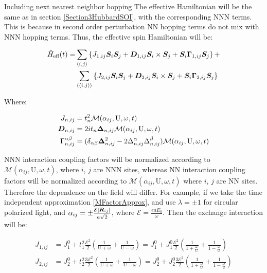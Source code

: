 \begin{section}{Including next nearest neighbor hopping}
The effective Hamiltonian will be the same as in section \ref{Section3HubbardSOI}, with the corresponding NNN terms. This is because in second order perturbation NN hopping terms do not mix with NNN hopping terms. Thus, the effective spin Hamiltonian will be:

\begin{align}
\hat{H}_{\text{eff}}(t) = &\sum_{\langle i,j \rangle} \left\{ J_{1,ij}\boldsymbol{S}_i\boldsymbol{S}_j + \boldsymbol{D}_{1,ij} \boldsymbol{S}_i \times \boldsymbol{S}_j + \boldsymbol{S}_i\boldsymbol{\Gamma}_{1,ij}\boldsymbol{S}_j\right\} + \nonumber \\
&\sum_{\langle \langle i,j \rangle \rangle} \left\{ J_{2,ij}\boldsymbol{S}_i\boldsymbol{S}_j + \boldsymbol{D}_{2,ij} \boldsymbol{S}_i \times \boldsymbol{S}_j + \boldsymbol{S}_i\boldsymbol{\Gamma}_{2,ij}\boldsymbol{S}_j\right\}
\end{align}

Where:

\begin{align}
J_{n,ij} &= t_n^2\mathcal{M}(\alpha_{ij}, \text{U}, \omega, t) \label{JGeneral} \\
\boldsymbol{D}_{n,ij} &= 2it_n \boldsymbol{\Delta}_{n,ij}\mathcal{M}(\alpha_{ij}, \text{U}, \omega, t) \label{DGeneral} \\
\Gamma_{n,ij}^{\alpha \beta} &= (\delta_{\alpha \beta} \boldsymbol{\Delta}_{n,ij}^2 - 2\Delta_{n,ij}^\alpha\Delta_{n,ij}^\beta )\mathcal{M}(\alpha_{ij}, \text{U}, \omega, t) \label{GammaGeneral}
\end{align}

NNN interaction coupling factors will be normalized according to $\mathcal{M}(\alpha_{ij}, \text{U}, \omega, t)$, where $i$, $j$ are NNN sites, whereas NN interaction coupling factors will be normalized according to $\mathcal{M}(\alpha_{ij}, \text{U}, \omega, t)$ where $i$, $j$ are NN sites. Therefore the dependence on the field will differ. For example, if we take the time independent approximation \ref{MFactorApprox}, and use $\lambda = \pm 1$ for circular polarized light, and $\alpha_{ij} = \pm\frac{\mathcal{E}|\boldsymbol{R}_{ij}|}{a\sqrt{2}}$, where $\mathcal{E} = \frac{eaE_0}{\omega}$. Then the exchange interaction will be:

\begin{align*}
J_{1,ij} &= J_1^0 + t_1^2 \frac{\mathcal{E}^2}{2} \left( \frac{1}{\text{U}+\omega} + \frac{1}{\text{U}-\omega} \right) = J_1^0 + J_1^0 \frac{\mathcal{E}^2}{2} \left( \frac{1}{1+\frac{\omega}{\text{U}}} + \frac{1}{1-\frac{\omega}{\text{U}}} \right) \\
J_{2,ij} &= J_2^0 + t_2^2 \frac{3\mathcal{E}^2}{2} \left( \frac{1}{\text{U}+\omega} + \frac{1}{\text{U}-\omega} \right) = J_2^0 + J_2^0 \frac{3\mathcal{E}^2}{2} \left( \frac{1}{1+\frac{\omega}{\text{U}}} + \frac{1}{1-\frac{\omega}{\text{U}}} \right) \\
\end{align*}


\end{section}
